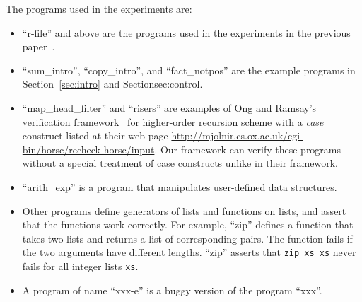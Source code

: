 The programs used in the experiments are:
\vspace{-5pt}
\begin{itemize}
\item ``r-file'' and above are the programs used in the experiments in
      the previous paper~\cite{KobayashiPLDI2011}.
\item ``sum\_intro'', ``copy\_intro'', and ``fact\_notpos'' are the example programs in
      Section~\ref{sec:intro} and Section{sec:control}.
\item ``map\_head\_filter'' and ``risers'' are examples of Ong and
      Ramsay's verification framework~\cite{Ong2011} for higher-order
      recursion scheme with a \textit{case} construct listed at their
      web page
      \url{http://mjolnir.cs.ox.ac.uk/cgi-bin/horsc/recheck-horsc/input}.
      Our framework can verify these programs without a special
      treatment of case constructs unlike in their framework.
\item ``arith\_exp'' is a program that manipulates user-defined data structures.
\item Other programs define generators of lists and functions on lists,
      and assert that the functions work correctly.  For example,
      ``zip'' defines a function that takes two lists and returns a list of corresponding pairs.
      The function fails if the two arguments have different lengths.
      ``zip'' asserts that \texttt{zip xs xs} never fails for all integer lists \texttt{xs}.
\item A program of name ``xxx-e'' is a buggy version of the program ``xxx''.
\end{itemize}
\vspace{-5pt}
